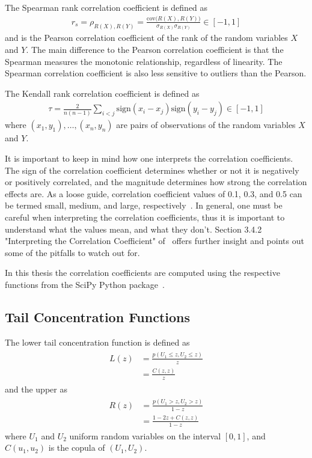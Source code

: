 The Spearman rank correlation coefficient is defined as
\begin{align}
    r_s = \rho_{R(X),R(Y)} = \frac{\text{cov}{\big(R(X),R(Y)\big)}}{\sigma_{R(X)} \sigma_{R(Y)}} \in [-1, 1]
\end{align}
and is the Pearson correlation coefficient of the rank of the random variables \( X \) and \( Y \).
The main difference to the Pearson correlation coefficient is that the Spearman measures the monotonic relationship, regardless of linearity.
The Spearman correlation coefficient is also less sensitive to outliers than the Pearson.

The Kendall rank correlation coefficient is defined as
\begin{align}
    \tau = \frac{2}{n(n-1)} \sum_{i<j} \text{sign}(x_i - x_j) \text{sign}(y_i - y_j) \in [-1, 1]
\end{align}
where \( (x_1, y_1), \dots, (x_n, y_n) \) are pairs of observations of the random variables \( X \) and \( Y \).

It is important to keep in mind how one interprets the correlation coefficients.
The sign of the correlation coefficient determines whether or not it is negatively or positively correlated, and the magnitude determines how strong the correlation effects are.
As a loose guide, correlation coefficient values of 0.1, 0.3, and 0.5 can be termed small, medium, and large, respectively~\cite{research_design_and_statistical_analysis}.
In general, one must be careful when interpreting the correlation coefficients, thus it is important to understand what the values mean, and what they don't.
Section 3.4.2 "Interpreting the Correlation Coefficient" of~\cite{research_design_and_statistical_analysis} offers further insight and points out some of the pitfalls to watch out for.

In this thesis the correlation coefficients are computed using the respective functions from the SciPy Python package~\cite{python_scipy}.

\subsection{Tail Concentration Functions}\label{app:tail_concentration_functions}
The lower tail concentration function is defined as~\cite{venter_2002}
\begin{align}
\begin{split}
    L(z)
        &= \frac{p(U_1 \le z, U_2 \le z)}{z} \\
        &= \frac{C(z,z)}{z}
\end{split}
\end{align}
and the upper as
\begin{align}
\begin{split}
    R(z)
        &= \frac{p(U_1 > z, U_2 > z)}{1-z} \\
        &= \frac{1 - 2z + C(z,z)}{1-z}
\end{split}
\end{align}
where \( U_1 \) and \( U_2 \) uniform random variables on the interval \( [0, 1] \), and \( C(u_1, u_2) \) is the copula of \( (U_1, U_2) \).

